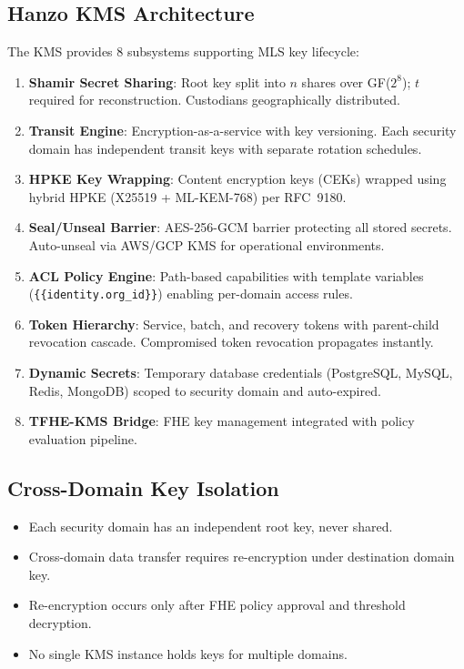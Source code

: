 \documentclass[11pt,letterpaper]{article}
\begin{document}
\subsection{Hanzo KMS Architecture}

The KMS provides 8 subsystems supporting MLS key lifecycle:

\begin{enumerate}
\item \textbf{Shamir Secret Sharing}: Root key split into $n$ shares over GF($2^8$); $t$ required for reconstruction. Custodians geographically distributed.
\item \textbf{Transit Engine}: Encryption-as-a-service with key versioning. Each security domain has independent transit keys with separate rotation schedules.
\item \textbf{HPKE Key Wrapping}: Content encryption keys (CEKs) wrapped using hybrid HPKE (X25519 + ML-KEM-768) per RFC~9180.
\item \textbf{Seal/Unseal Barrier}: AES-256-GCM barrier protecting all stored secrets. Auto-unseal via AWS/GCP KMS for operational environments.
\item \textbf{ACL Policy Engine}: Path-based capabilities with template variables (\texttt{\{\{identity.org\_id\}\}}) enabling per-domain access rules.
\item \textbf{Token Hierarchy}: Service, batch, and recovery tokens with parent-child revocation cascade. Compromised token revocation propagates instantly.
\item \textbf{Dynamic Secrets}: Temporary database credentials (PostgreSQL, MySQL, Redis, MongoDB) scoped to security domain and auto-expired.
\item \textbf{TFHE-KMS Bridge}: FHE key management integrated with policy evaluation pipeline.
\end{enumerate}

\subsection{Cross-Domain Key Isolation}

\begin{itemize}
\item Each security domain has an independent root key, never shared.
\item Cross-domain data transfer requires re-encryption under destination domain key.
\item Re-encryption occurs only after FHE policy approval and threshold decryption.
\item No single KMS instance holds keys for multiple domains.
\end{itemize}
\end{document}
